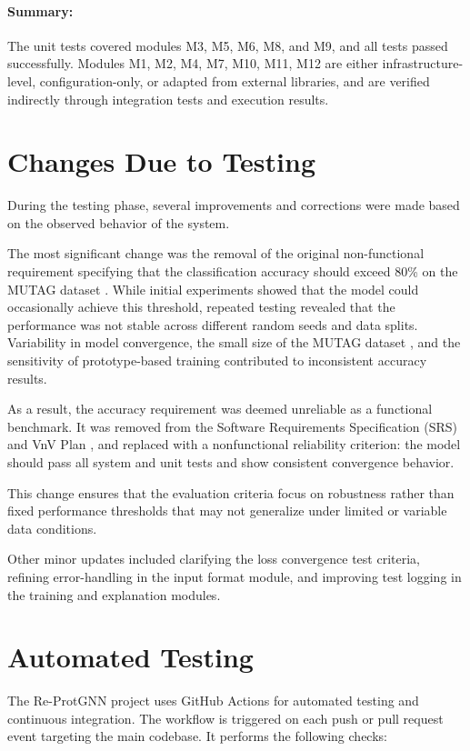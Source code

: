 \documentclass[12pt, titlepage]{article}
\begin{document}
\paragraph{Summary:} The unit tests covered modules M3, M5, M6, M8, and M9, and all tests passed successfully. Modules M1, M2, M4, M7, M10, M11, M12 are either infrastructure-level, configuration-only, or adapted from external libraries, and are verified indirectly through integration tests and execution results.

\section{Changes Due to Testing}

During the testing phase, several improvements and corrections were made based on the observed behavior of the system.

The most significant change was the removal of the original non-functional requirement specifying that the classification accuracy should exceed 80\% on the MUTAG dataset \citep{debnath1991structure}. While initial experiments showed that the model could occasionally achieve this threshold, repeated testing revealed that the performance was not stable across different random seeds and data splits. Variability in model convergence, the small size of the MUTAG dataset \citep{debnath1991structure}, and the sensitivity of prototype-based training contributed to inconsistent accuracy results.

As a result, the accuracy requirement was deemed unreliable as a functional benchmark. It was removed from the Software Requirements Specification (SRS) \citep{Yuanqi_ReProtGNN_SRS} and VnV Plan \citep{Yuanqi_ReProtGNN_VnV}, and replaced with a nonfunctional reliability criterion: the model should pass all system and unit tests and show consistent convergence behavior.

This change ensures that the evaluation criteria focus on robustness rather than fixed performance thresholds that may not generalize under limited or variable data conditions.

Other minor updates included clarifying the loss convergence test criteria, refining error-handling in the input format module, and improving test logging in the training and explanation modules.


\section{Automated Testing}
The Re-ProtGNN project uses GitHub Actions for automated testing and continuous integration. The workflow is triggered on each push or pull request event targeting the main codebase. It performs the following checks:
\end{document}
